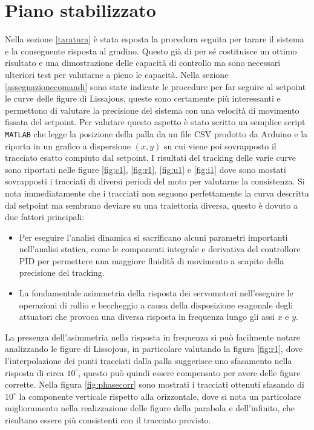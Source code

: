\documentclass[12pt,twoside,openright]{report}
\begin{document}
\section{Piano stabilizzato}\label{resultpiano}
Nella sezione \ref{taratura} è stata esposta la procedura seguita per tarare il sistema e la conseguente risposta al gradino. Questo già di per sé costituisce un ottimo risultato e una dimostrazione delle capacità di controllo ma sono necessari ulteriori test per valutarne a pieno le capacità. Nella sezione \ref{assegnazionecomandi} sono state indicate le procedure per far seguire al setpoint le curve delle figure di Lissajous, queste sono certamente più interessanti e permettono di valutare la precisione del sistema con una velocità di movimento fissata del setpoint. Per valutare questo aspetto è stato scritto un semplice script \texttt{MATLAB} che legge la posizione della palla da un file CSV prodotto da Arduino e la riporta in un grafico a dispersione $(x,y)$ su cui viene poi sovrapposto il tracciato esatto compiuto dal setpoint. I risultati del tracking delle varie curve sono riportati nelle figure \ref{fig:c1}, \ref{fig:r1}, \ref{fig:u1} e \ref{fig:i1} dove sono mostati sovrapposti i tracciati di diversi periodi del moto per valutarne la consistenza. Si nota immediatamente che i tracciati non seguono perfettamente la curva descritta dal setpoint ma sembrano deviare su una traiettoria diversa, questo è dovuto a due fattori principali: 
\begin{itemize}
\item Per eseguire l'analisi dinamica si sacrificano alcuni parametri importanti nell'analisi statica, come le componenti integrale e derivativa del controllore PID per permettere una maggiore fluidità di movimento a scapito della precisione del tracking.
\item La fondamentale asimmetria della risposta dei servomotori nell'eseguire le operazioni di rollio e beccheggio a causa della disposizione esagonale degli attuatori che provoca una diversa risposta in frequenza lungo gli assi $x$ e $y$.
\end{itemize}
La presenza dell'asimmetria nella risposta in frequenza si può facilmente notare analizzando le figure di Lissojous, in particolare valutando la figura \ref{fig:r1}, dove l'interpolazione dei punti tracciati dalla palla suggerisce uno sfasamento nella risposta di circa $10^\circ$, questo può quindi essere compensato per avere delle figure corrette.
Nella figura \ref{fig:phasecorr} sono mostrati i tracciati ottenuti sfasando di $10^\circ$ la componente verticale rispetto alla orizzontale, dove si nota un particolare miglioramento nella realizzazione delle figure della parabola e dell'infinito, che risultano essere più consistenti con il tracciato previsto.
\end{document}
